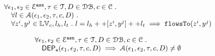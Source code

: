 %
\begin{thm}
\label{thm:alg_correct}
\[
\begin{array}{l}
  \forall \mathtt{\epsilon}_1, \mathtt{\epsilon}_2 \in \mathcal{E}^{\mathtt{{asn}}}, \mathtt{\tau} \in \mathcal{T}, D \in \mathcal{DB} , c \in \mathcal{C} ~.~
  \\ \quad 
   \forall l \in \mathcal{A}(\mathtt{\epsilon}_1, \mathtt{\epsilon}_2, \mathtt{\tau}, c, D) ~.~
   \\ \quad 
   \forall z^i, y^j \in \mathbb{LV}_c, l_h, l_t ~.~ 
   l = l_h ++ [z^i, y^j] ++ l_t 
   \implies \mathtt{flowsTo}(z^i, y^j)
\end{array}
\]
\end{thm}
%
%
\begin{thm}
\label{thm:algeventdep_sound}
\[
\begin{array}{l}
  \forall \mathtt{\epsilon}_1, \mathtt{\epsilon}_2 \in \mathcal{E}^{\mathtt{{asn}}}, \mathtt{\tau} \in \mathcal{T}, D \in \mathcal{DB} , c \in \mathcal{C} ~.~
  \\ \quad 
  \mathsf{DEP_{\mathtt{e}}}(\mathtt{\epsilon}_1, \mathtt{\epsilon}_2,\mathtt{\tau}, {c}, D)
   \implies
   \mathcal{A}(\mathtt{\epsilon}_1, \mathtt{\epsilon}_2, \mathtt{\tau}, c, D) \neq \emptyset
\end{array}
\]
\end{thm}
%
